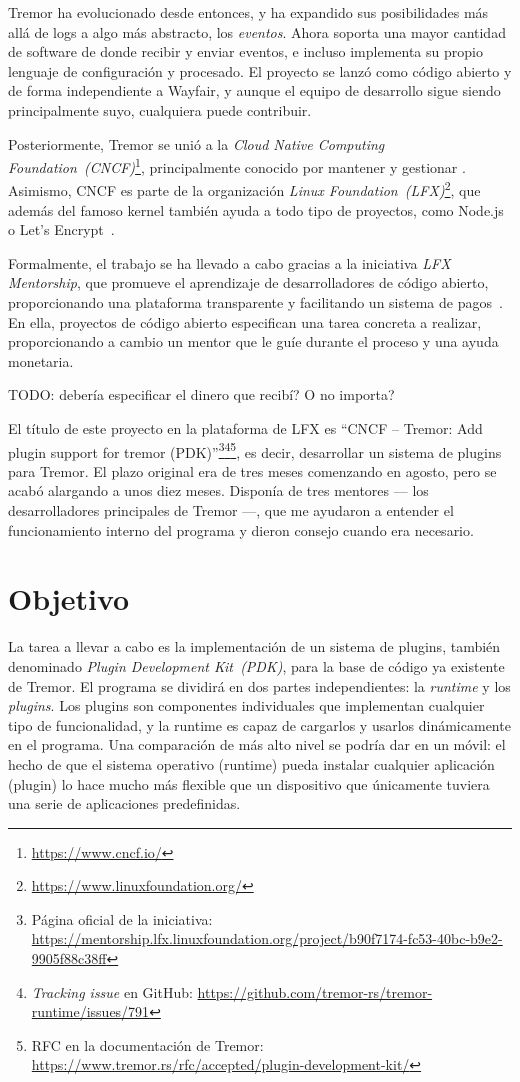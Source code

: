 Tremor ha evolucionado desde entonces, y ha expandido sus posibilidades más allá
de logs a algo más abstracto, los \emph{eventos}. Ahora soporta una mayor
cantidad de software de donde recibir y enviar eventos, e incluso implementa su
propio lenguaje de configuración y procesado. El proyecto se lanzó como código
abierto y de forma independiente a Wayfair, y aunque el equipo de desarrollo
sigue siendo principalmente suyo, cualquiera puede contribuir.

Posteriormente, Tremor se unió a la \emph{Cloud Native Computing
Foundation~(CNCF)}\footnote{\url{https://www.cncf.io/}}, principalmente conocido
por mantener y gestionar \textcite{k8s}. Asimismo, CNCF es parte de la
organización \emph{Linux
Foundation~(LFX)}\footnote{\url{https://www.linuxfoundation.org/}}, que además
del famoso kernel también ayuda a todo tipo de proyectos, como Node.js o Let's
Encrypt~\cite{lfx_projects}.

Formalmente, el trabajo se ha llevado a cabo gracias a la iniciativa \emph{LFX
Mentorship}, que promueve el aprendizaje de desarrolladores de código abierto,
proporcionando una plataforma transparente y facilitando un sistema de
pagos~\cite{lfx_mentorship}. En ella, proyectos de código abierto especifican
una tarea concreta a realizar, proporcionando a cambio un mentor que le guíe
durante el proceso y una ayuda monetaria.

TODO: debería especificar el dinero que recibí? O no importa?

El título de este proyecto en la plataforma de LFX es ``CNCF -- Tremor: Add
plugin support for tremor (PDK)''\footnote{Página oficial de la iniciativa:
\url{https://mentorship.lfx.linuxfoundation.org/project/b90f7174-fc53-40bc-b9e2-9905f88c38ff}}\footnote{\emph{Tracking
issue} en GitHub:
\url{https://github.com/tremor-rs/tremor-runtime/issues/791}}\footnote{RFC en la
documentación de Tremor:
\url{https://www.tremor.rs/rfc/accepted/plugin-development-kit/}}, es decir,
desarrollar un sistema de plugins para Tremor. El plazo original era de tres
meses comenzando en agosto, pero se acabó alargando a unos diez meses. Disponía
de tres mentores --- los desarrolladores principales de Tremor ---, que me
ayudaron a entender el funcionamiento interno del programa y dieron consejo
cuando era necesario.

\section{Objetivo}

La tarea a llevar a cabo es la implementación de un sistema de plugins, también
denominado \emph{Plugin Development Kit~(PDK)}, para la base de código ya
existente de Tremor. El programa se dividirá en dos partes independientes: la
\emph{runtime} y los \emph{plugins}. Los plugins son componentes individuales
que implementan cualquier tipo de funcionalidad, y la runtime es capaz de
cargarlos y usarlos dinámicamente en el programa. Una comparación de más alto
nivel se podría dar en un móvil: el hecho de que el sistema operativo (runtime)
pueda instalar cualquier aplicación (plugin) lo hace mucho más flexible que un
dispositivo que únicamente tuviera una serie de aplicaciones predefinidas.

